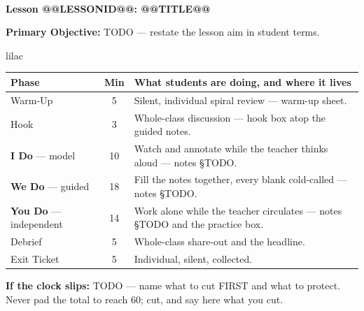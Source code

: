 \documentclass[10pt]{article}
\makeatletter
\newcommand{\LessonNumberName}{Lesson @@LESSONID@@: @@TITLE@@}
\makeatother
\begin{document}
\begin{center}
    {\Large\bfseries \CourseName \\
    {\small\bfseries \UnitNumberName \LessonNumberName}}
\end{center}

\begin{tcolorbox}[colback=lilac, colframe=plum, boxrule=0.9pt, arc=2mm,
    left=2mm, right=2mm, top=1.5mm, bottom=1.5mm]
    \textbf{Primary Objective:} TODO --- restate the lesson aim in student terms.
\end{tcolorbox}

\boxguard[22]
\begin{skillbox}{lilac}
\small
\renewcommand{\arraystretch}{1.25}
\begin{tabularx}{\linewidth}{@{} l c X @{}}
\textbf{Phase} & \textbf{Min} & \textbf{What students are doing, and where it lives} \\
\midrule
Warm-Up                       & 5  & Silent, individual spiral review --- warm-up sheet. \\
Hook                          & 3  & Whole-class discussion --- hook box atop the guided notes. \\
\textbf{I Do} --- model       & 10 & Watch and annotate while the teacher thinks aloud --- notes \S TODO. \\
\textbf{We Do} --- guided     & 18 & Fill the notes together, every blank cold-called --- notes \S TODO. \\
\textbf{You Do} --- independent & 14 & Work alone while the teacher circulates --- notes \S TODO and the practice box. \\
Debrief                       & 5  & Whole-class share-out and the headline. \\
Exit Ticket                   & 5  & Individual, silent, collected. \\
\end{tabularx}

\smallskip
\textbf{If the clock slips:} TODO --- name what to cut FIRST and what to protect.
Never pad the total to reach 60; cut, and say here what you cut.
\end{skillbox}
\end{document}
